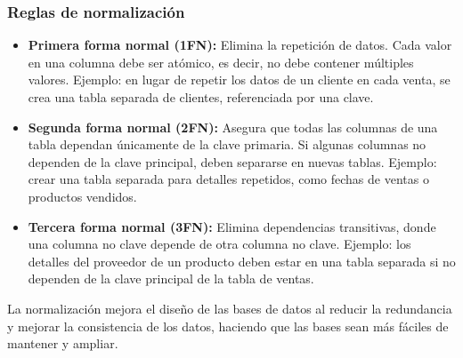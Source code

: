 \begin{center}
    \subsubsection{Reglas de normalización}

        \begin{itemize}
            \item \textbf{Primera forma normal (1FN):} Elimina la repetición de datos. Cada valor en una 
            columna debe ser atómico, es decir, no debe contener múltiples valores. 
            Ejemplo: en lugar de repetir los datos de un cliente en cada venta, 
            se crea una tabla separada de clientes, referenciada por una clave.
            \item \textbf{Segunda forma normal (2FN):} Asegura que todas las columnas de una tabla dependan 
            únicamente de la clave primaria. Si algunas columnas no dependen de la clave principal, 
            deben separarse en nuevas tablas. Ejemplo: crear una tabla separada para detalles repetidos, 
            como fechas de ventas o productos vendidos.
            \item \textbf{Tercera forma normal (3FN):} Elimina dependencias transitivas, donde una columna no clave 
            depende de otra columna no clave. Ejemplo: los detalles del proveedor de un producto deben estar 
            en una tabla separada si no dependen de la clave principal de la tabla de ventas.
        \end{itemize}

        La normalización mejora el diseño de las bases de datos al reducir la redundancia y 
        mejorar la consistencia de los datos, haciendo que las bases sean más fáciles de mantener 
        y ampliar.


\end{center}